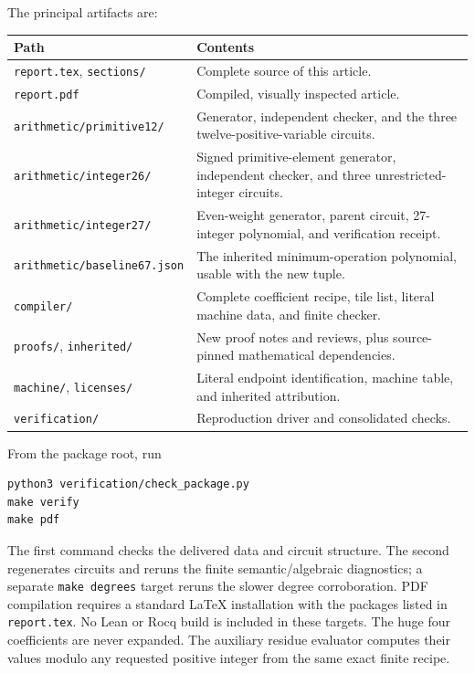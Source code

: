 The principal artifacts are:
\begin{center}\small
\begin{tabular}{>{\raggedright\arraybackslash}p{49mm}>{\raggedright\arraybackslash}p{97mm}}
\toprule
Path & Contents\\
\midrule
\texttt{report.tex}, \texttt{sections/} & Complete source of this article.\\
\texttt{report.pdf} & Compiled, visually inspected article.\\
\texttt{arithmetic/primitive12/} & Generator, independent checker, and
the three twelve-positive-variable circuits.\\
\texttt{arithmetic/integer26/} & Signed primitive-element generator,
independent checker, and three unrestricted-integer circuits.\\
\texttt{arithmetic/integer27/} & Even-weight generator, parent circuit,
27-integer polynomial, and verification receipt.\\
\texttt{arithmetic/baseline67.json} & The inherited minimum-operation
polynomial, usable with the new tuple.\\
\texttt{compiler/} & Complete coefficient recipe, tile list,
literal machine data, and finite checker.\\
\texttt{proofs/}, \texttt{inherited/} & New proof notes and reviews,
plus source-pinned mathematical dependencies.\\
\texttt{machine/}, \texttt{licenses/} & Literal endpoint identification,
machine table, and inherited attribution.\\
\texttt{verification/} & Reproduction driver and consolidated checks.\\
\bottomrule
\end{tabular}
\end{center}

\begin{samepage}
From the package root, run
\begin{verbatim}
python3 verification/check_package.py
make verify
make pdf
\end{verbatim}
\end{samepage}
The first command checks the delivered data and circuit structure.
The second regenerates circuits and reruns the finite semantic/algebraic
diagnostics; a separate \texttt{make degrees} target reruns the slower
degree corroboration.  PDF compilation requires a standard LaTeX
installation with the packages listed in \texttt{report.tex}.
No Lean or Rocq build is included in these targets.
The huge four coefficients are never expanded.  The auxiliary residue
evaluator computes their values modulo any requested positive integer
from the same exact finite recipe.

